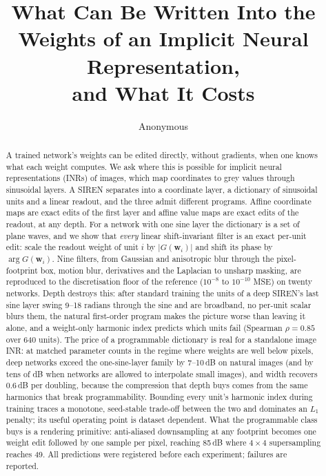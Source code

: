 \documentclass[11pt]{article}
\title{What Can Be Written Into the Weights of an Implicit Neural Representation,\\ and What It Costs}
\author{Anonymous}
\date{}
\begin{document}
\maketitle

\begin{abstract}
A trained network's weights can be edited directly, without gradients, when one knows what each weight computes. We ask where this is possible for implicit neural representations (INRs) of images, which map coordinates to grey values through sinusoidal layers. A SIREN separates into a coordinate layer, a dictionary of sinusoidal units and a linear readout, and the three admit different programs. Affine coordinate maps are exact edits of the first layer and affine value maps are exact edits of the readout, at any depth. For a network with one sine layer the dictionary is a set of plane waves, and we show that \emph{every} linear shift-invariant filter is an exact per-unit edit: scale the readout weight of unit $i$ by $|G(\mathbf w_i)|$ and shift its phase by $\arg G(\mathbf w_i)$. Nine filters, from Gaussian and anisotropic blur through the pixel-footprint box, motion blur, derivatives and the Laplacian to unsharp masking, are reproduced to the discretisation floor of the reference ($10^{-8}$ to $10^{-10}$ MSE) on twenty networks. Depth destroys this: after standard training the units of a deep SIREN's last sine layer swing 9--18 radians through the sine and are broadband, no per-unit scalar blurs them, the natural first-order program makes the picture worse than leaving it alone, and a weight-only harmonic index predicts which units fail (Spearman $\rho=0.85$ over 640 units). The price of a programmable dictionary is real for a standalone image INR: at matched parameter counts in the regime where weights are well below pixels, deep networks exceed the one-sine-layer family by 7--10\,dB on natural images (and by tens of dB when networks are allowed to interpolate small images), and width recovers 0.6\,dB per doubling, because the compression that depth buys comes from the same harmonics that break programmability. Bounding every unit's harmonic index during training traces a monotone, seed-stable trade-off between the two and dominates an $L_1$ penalty; its useful operating point is dataset dependent. What the programmable class buys is a rendering primitive: anti-aliased downsampling at any footprint becomes one weight edit followed by one sample per pixel, reaching 85\,dB where $4\times4$ supersampling reaches 49. All predictions were registered before each experiment; failures are reported.
\end{abstract}
\end{document}
